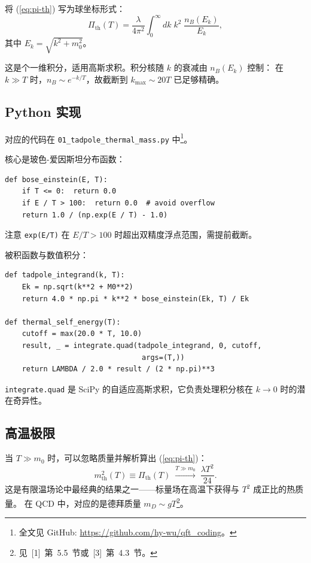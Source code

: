\documentclass[12pt,a4paper]{article}
\begin{document}
将 (\ref{eq:pi-th}) 写为球坐标形式：
\begin{equation}
\Pi_{\text{th}}(T) = \frac{\lambda}{4\pi^2} \int_0^{\infty} dk\; k^2\; \frac{n_B(E_k)}{E_k},
\label{eq:pi-th-spherical}
\end{equation}
其中 $E_k = \sqrt{k^2 + m_0^2}$。

这是个一维积分，适用高斯求积。积分核随 $k$ 的衰减由 $n_B(E_k)$ 控制：
在 $k \gg T$ 时，$n_B \sim e^{-k/T}$，故截断到 $k_{\max} \sim 20T$ 已足够精确。

\subsection{Python 实现}

对应的代码在 \texttt{01\_tadpole\_thermal\_mass.py} 中\footnote{全文见 GitHub: \url{https://github.com/hy-wu/qft_coding}。}。

核心是玻色-爱因斯坦分布函数：
\begin{verbatim}
def bose_einstein(E, T):
    if T <= 0:  return 0.0
    if E / T > 100:  return 0.0  # avoid overflow
    return 1.0 / (np.exp(E / T) - 1.0)
\end{verbatim}
注意 \texttt{exp(E/T)} 在 $E/T > 100$ 时超出双精度浮点范围，需提前截断。

被积函数与数值积分：
\begin{verbatim}
def tadpole_integrand(k, T):
    Ek = np.sqrt(k**2 + M0**2)
    return 4.0 * np.pi * k**2 * bose_einstein(Ek, T) / Ek

def thermal_self_energy(T):
    cutoff = max(20.0 * T, 10.0)
    result, _ = integrate.quad(tadpole_integrand, 0, cutoff,
                                args=(T,))
    return LAMBDA / 2.0 * result / (2 * np.pi)**3
\end{verbatim}
\texttt{integrate.quad} 是 SciPy 的自适应高斯求积，它负责处理积分核在 $k \to 0$ 时的潜在奇异性。

\subsection{高温极限}

当 $T \gg m_0$ 时，可以忽略质量并解析算出 (\ref{eq:pi-th})：
\begin{equation}
m_{\text{th}}^2(T) \equiv \Pi_{\text{th}}(T) \;\xrightarrow{T \gg m_0}\; \frac{\lambda T^2}{24}.
\label{eq:ht-limit}
\end{equation}
这是有限温场论中最经典的结果之一——标量场在高温下获得与 $T^2$ 成正比的热质量。
在 QCD 中，对应的是德拜质量 $m_D \sim gT$\footnote{见~[1]~第~5.5~节或~[3]~第~4.3~节。}。
\end{document}
